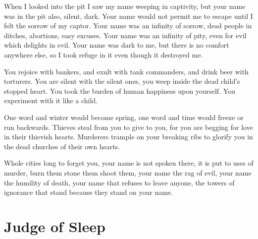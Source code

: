 \documentclass[english,11pt,letterpaper,onecolumn]{scrbook}
\begin{document}
\begin{poem}
\begin{stanza}
When I looked into the pit I saw my name weeping in captivity, but your name was in the pit also, silent, dark.\verseline
Your name would not permit me to escape until I felt the sorrow of my captor.  Your name was an infinity of sorrow, dead people in ditches, abortions, easy excuses.  Your name was an infinity of pity, even for evil which delights in evil.\verseline
Your name was dark to me, but there is no comfort anywhere else, so I took refuge in it even though it destroyed me.
\end{stanza}

\begin{stanza}
You rejoice with bankers, and exult with tank commanders, and drink beer with torturers.\verseline
You are silent with the silent ones, you weep inside the dead child's stopped heart.\verseline
You took the burden of human happiness upon yourself.  You experiment with it like a child.
\end{stanza}

\begin{stanza}
One word and winter would become spring, one word and time would freeze or run backwards.\verseline
Thieves steal from you to give to you, for you are begging for love in their thievish hearts.\verseline
Murderers trample on your breaking ribs to glorify you in the dead churches of their own hearts.
\end{stanza}

\begin{stanza}
Whole cities long to forget you, your name is not spoken there, it is put to uses of murder, burn them stone them shoot them, your name the rag of evil, your name the humility of death, your name that refuses to leave anyone, the towers of ignorance that stand because they stand on your name.
\end{stanza}
\end{poem}

\newpage
\section{Judge of Sleep}
\end{document}

